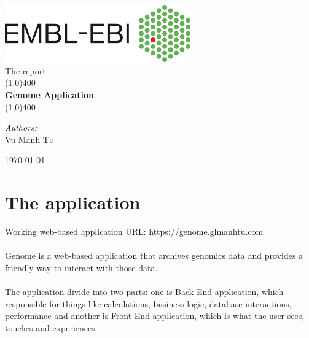 \documentclass[a4paper,12pt]{article}
\begin{document}
\begin{titlepage}
	\begin{center}
\includegraphics[width=0.6\textwidth]{images/Ebi_official_logo}\\[1cm]

{\Large The report}\\[0.5cm]	
	
	\line(1,0){400}\\[0.2in]
	\huge{\bfseries Genome Application}\\
	\line(1,0){400}\\[1.5cm]
	\noindent	
	

	
		\begin{center} \large
    	\emph{Authors:}\\
    	Vu Manh \textsc{Tu}\\
		\end{center}

\vfill

{\large \today}
	\end{center}
\end{titlepage}

\tableofcontents
\thispagestyle{empty}
\clearpage

\section{The application}
Working web-based application URL: \url{https://genome.glmanhtu.com}\\\\
Genome is a web-based application that archives genomics data and provides a friendly way to interact with those data.\\\\
The application divide into two parts: one is Back-End application, which responsible for things like calculations, business logic, database interactions, performance and another is Front-End application, which is what the user sees, touches and experiences.
\end{document}
